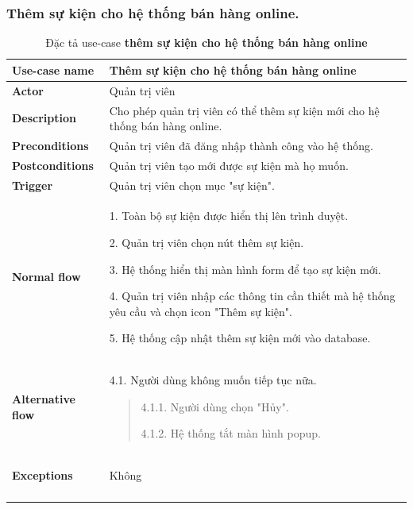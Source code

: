 \subsubsection{Thêm sự kiện cho hệ thống bán hàng online.}
{
    \setlength\extrarowheight{6pt}
    \begin{longtable}{| p{} | p{} |}
        \hline
        \textbf{Use-case name}
         &
        Thêm sự kiện cho hệ thống bán hàng online
        \\
        \hline
        \textbf{Actor}
         &
        Quản trị viên
        \\
        \hline
        \textbf{Description}
         &
        Cho phép quản trị viên có thể thêm sự kiện mới cho hệ thống bán hàng online.
        \\
        \hline
        \textbf{Preconditions}
         &
        Quản trị viên đã đăng nhập thành công vào hệ thống.
        \\
        \hline
        \textbf{Postconditions}
         &
        Quản trị viên tạo mới được sự kiện mà họ muốn.
        \\
        \hline
        \textbf{Trigger}
         &
        Quản trị viên chọn mục "sự kiện".
        \\
        \hline
        \begin{flushleft}
            \textbf{Normal flow}
        \end{flushleft}
         &
        1. Toàn bộ sự kiện được hiển thị lên trình duyệt.

        2. Quản trị viên chọn nút thêm sự kiện.

        3. Hệ thống hiển thị màn hình form để tạo sự kiện mới.

        4. Quản trị viên nhập các thông tin cần thiết mà hệ thống yêu cầu và chọn icon "Thêm sự kiện".

        5. Hệ thống cập nhật thêm sự kiện mới vào database.
        \\
        \hline
        \begin{flushleft}
            \textbf{Alternative flow}
        \end{flushleft}
         &
        4.1. Người dùng không muốn tiếp tục nữa.
        \begin{quote}
            4.1.1. Người dùng chọn "Hủy".

            4.1.2. Hệ thống tắt màn hình popup.
        \end{quote}
        \\
        \hline
        \begin{flushleft}
            \textbf{Exceptions}
        \end{flushleft}
         &
        Không
        \\
        \hline
        \caption{Đặc tả use-case \textbf{thêm sự kiện cho hệ thống bán hàng online}}
    \end{longtable}
}

